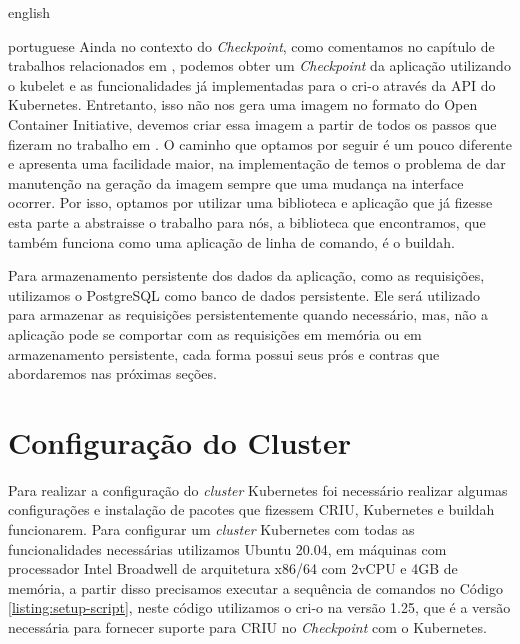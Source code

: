 \begin{otherlanguage*}{english}
\begin{otherlanguage*}{portuguese}
Ainda no contexto do \textit{Checkpoint}, como comentamos no capítulo de trabalhos
relacionados em \cite{schmidttransparent}, podemos obter um \textit{Checkpoint} da
aplicação utilizando o kubelet e as funcionalidades já implementadas para o cri-o
através da API do Kubernetes. Entretanto, isso não nos gera uma imagem no formato
do Open Container Initiative, devemos criar essa imagem a partir de todos os
passos que fizeram no trabalho em \cite{schmidttransparent}. O caminho que optamos
por seguir é um pouco diferente e apresenta uma facilidade maior, na implementação
de \cite{schmidttransparent} temos o problema de dar manutenção na geração da imagem
sempre que uma mudança na interface ocorrer. Por isso, optamos por utilizar uma
biblioteca e aplicação que já fizesse esta parte a abstraisse o trabalho para nós, a
biblioteca que encontramos, que também funciona como uma aplicação de linha de comando,
é o buildah\cite{buildah}.

Para armazenamento persistente dos dados da aplicação, como as requisições, utilizamos
o PostgreSQL \cite{postgresql} como banco de dados persistente. Ele será utilizado para
armazenar as requisições persistentemente quando necessário, mas, não a aplicação pode
se comportar com as requisições em memória ou em armazenamento persistente, cada forma
possui seus prós e contras que abordaremos nas próximas seções.

\section{Configuração do Cluster}

Para realizar a configuração do \textit{cluster} Kubernetes foi necessário realizar
algumas configurações e instalação de pacotes que fizessem CRIU, Kubernetes e buildah
funcionarem. Para configurar um \textit{cluster} Kubernetes com todas as funcionalidades
necessárias utilizamos Ubuntu 20.04, em máquinas com processador Intel Broadwell de
arquitetura x86/64 com 2vCPU e 4GB de memória, a partir disso precisamos executar a
sequência de comandos no Código \ref{listing:setup-script}, neste código utilizamos
o cri-o na versão 1.25, que é a versão necessária para fornecer suporte para CRIU no
\textit{Checkpoint} com o Kubernetes.


\end{otherlanguage*}
\end{otherlanguage*}
